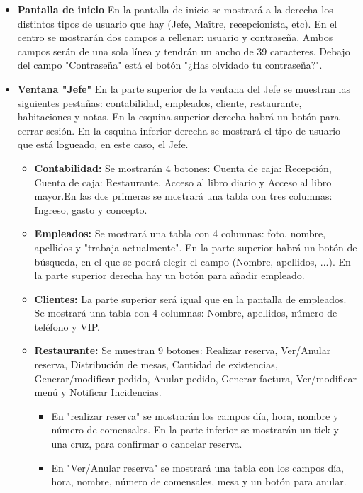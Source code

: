 \documentclass[spanish,a4paper,12pt]{report}		%
\begin{document}
			\begin{itemize}
				\item \textbf{Pantalla de inicio} En la pantalla de inicio se mostrará a la derecha los distintos tipos de usuario que hay (Jefe, Maître, recepcionista, etc). En el centro se mostrarán dos campos a rellenar: usuario y contraseña. Ambos campos serán de una sola línea y tendrán un ancho de 39 caracteres. Debajo del campo "Contraseña" está el botón "¿Has olvidado tu contraseña?".
				\item \textbf{Ventana "Jefe"} En la parte superior de la ventana del Jefe se muestran las siguientes pestañas: contabilidad, empleados, cliente, restaurante, habitaciones y notas. En la esquina superior derecha habrá un botón para cerrar sesión. En la esquina inferior derecha se mostrará el tipo de usuario que está logueado, en este caso, el Jefe. 
				\begin{itemize}
					\item \textbf{Contabilidad: }Se mostrarán 4 botones: Cuenta de caja: Recepción, Cuenta de caja: Restaurante, Acceso al libro diario y Acceso al libro mayor.En las dos primeras se mostrará una tabla con tres columnas: Ingreso, gasto y concepto.
					 \item \textbf{Empleados: }Se mostrará una tabla con 4 columnas: foto, nombre, apellidos y "trabaja actualmente". En la parte superior habrá un botón de búsqueda, en el que se podrá elegir el campo (Nombre, apellidos, ...).
						En la parte superior derecha hay un botón para añadir empleado. 
					 \item \textbf{Clientes: }La parte superior será igual que en la pantalla de empleados. Se mostrará una tabla con 4 columnas: Nombre, apellidos, número de teléfono y VIP. 
					 \item \textbf{Restaurante: }Se muestran 9 botones: Realizar reserva, Ver/Anular reserva, Distribución de mesas, Cantidad de existencias, Generar/modificar pedido, Anular pedido, Generar factura, Ver/modificar menú y Notificar Incidencias.
					\begin{itemize}
						\item En "realizar reserva" se mostrarán los campos día, hora, nombre y número de comensales. En la parte inferior se mostrarán un tick y una cruz, para confirmar o cancelar reserva. 
						\item En "Ver/Anular reserva" se mostrará una tabla con los campos día, hora, nombre, número de comensales, mesa y un botón para anular. 

\end{itemize}
\end{itemize}
\end{itemize}
\end{document}
